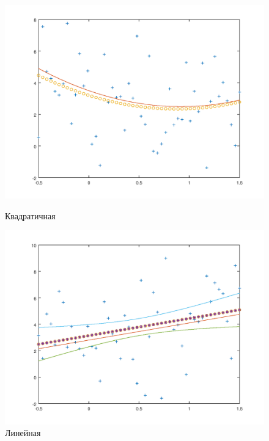 \documentclass{article}
\begin{document}
	\begin{figure}[h]
		\centering
		\begin{minipage}{0.45\textwidth}
			\centering
			\includegraphics[width=\textwidth]{quad.png}
			\caption{Квадратичная}
		\end{minipage}\hfill
		\begin{minipage}{0.45\textwidth}
			\centering
			\includegraphics[width=\textwidth]{linear.png}
			\caption{Линейная}
		\end{minipage}
	\end{figure}
\end{document}

